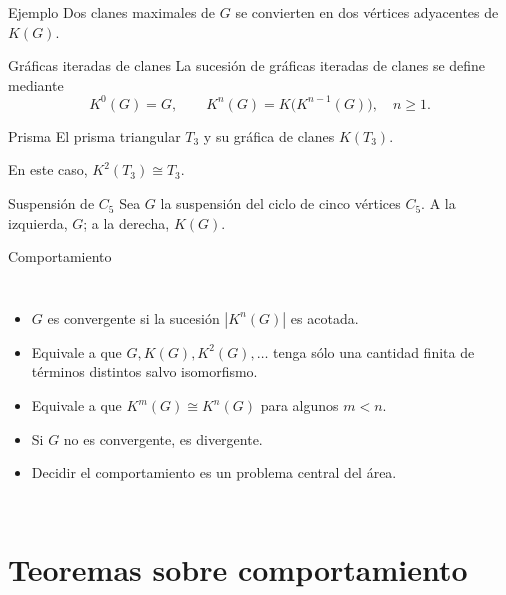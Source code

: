 \documentclass[aspectratio=169,10pt]{beamer}
\begin{document}
\begin{frame}{Ejemplo}
\centering
Dos clanes maximales de $G$ se convierten en dos vértices adyacentes de $K(G)$.
\par\medskip
{}
\end{frame}

\begin{frame}{Gráficas iteradas de clanes}
\centering
La sucesión de \alert{gráficas iteradas de clanes} se define mediante
\[
K^{0}(G)=G,\qquad K^{n}(G)=K\bigl(K^{n-1}(G)\bigr),\quad n\ge 1.
\]
\vspace{-.4em}
\end{frame}

\begin{frame}{Prisma}
\centering
El prisma triangular $T_3$ y su gráfica de clanes $K(T_3)$.
\par\medskip
{}
\par\smallskip
En este caso, $K^2(T_3)\cong T_3$.
\end{frame}

\begin{frame}{Suspensión de $C_5$}
\centering
Sea $G$ la suspensión del ciclo de cinco vértices $C_5$.
A la izquierda, $G$; a la derecha, $K(G)$.
\par\medskip
{}
\end{frame}

\begin{frame}{Comportamiento}
\begin{columns}[T,onlytextwidth]
\SmallText
\begin{itemize}
\item $G$ es \alert{convergente} si la sucesión $|K^n(G)|$ es acotada.
\item Equivale a que $G,K(G),K^2(G),\ldots$ tenga sólo una cantidad finita de términos distintos salvo isomorfismo.
\item Equivale a que $K^m(G)\cong K^n(G)$ para algunos $m<n$.
\item Si $G$ no es convergente, es \alert{divergente}.
\item Decidir el comportamiento es un problema central del área.
\end{itemize}
\centering{}
\end{columns}
\end{frame}

\section{Teoremas sobre comportamiento}
\end{document}
